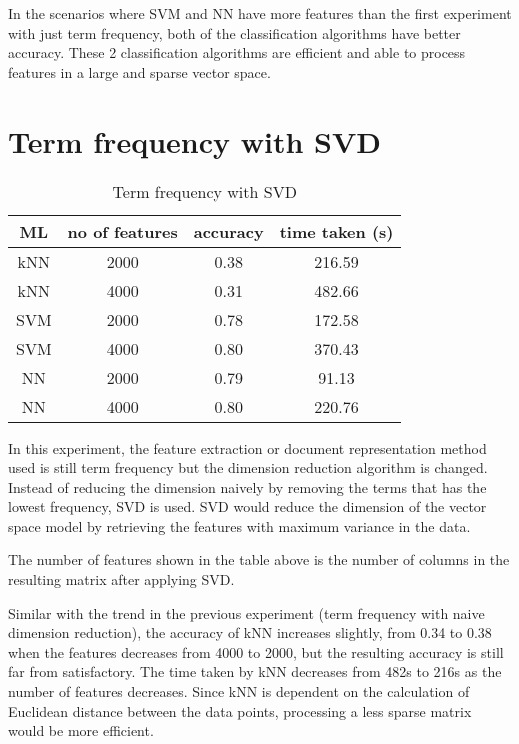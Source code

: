 In the scenarios where SVM and NN have more features than the first experiment with just term frequency, both of the classification algorithms have better accuracy. These 2 classification algorithms are efficient and able to process features in a large and sparse vector space.


\clearpage
\section{Term frequency with SVD}

\begin{table} [ht]
	\centering
	\begin{tabular}{|| c | c | c | c||}
		\hline
		ML & no of features & accuracy & time taken (s) \\ [0.5ex]
		\hline\hline
		kNN & 2000 & 0.38 & 216.59 \\ 
		\hline
		kNN & 4000 & 0.31 & 482.66 \\
		\hline\hline
		SVM & 2000 & 0.78 & 172.58 \\
		\hline
		SVM & 4000 & 0.80 & 370.43 \\
		\hline\hline
		NN & 2000 & 0.79 & 91.13 \\
		\hline
		NN & 4000 & 0.80 & 220.76 \\
		\hline
	\end{tabular}
\caption{Term frequency with SVD}
\label{tbl:termFrequencySvd}
\end{table}

In this experiment, the feature extraction or document representation method used is still term frequency but the dimension reduction algorithm is changed. Instead of reducing the dimension naively by removing the terms that has the lowest frequency, SVD is used. SVD would reduce the dimension of the vector space model by retrieving the features with maximum variance in the data.

The number of features shown in the table above is the number of columns in the resulting matrix after applying SVD.

Similar with the trend in the previous experiment (term frequency with naive dimension reduction), the accuracy of kNN increases slightly, from 0.34 to 0.38 when the features decreases from 4000 to 2000, but the resulting accuracy is still far from satisfactory. The time taken by kNN decreases from 482s to 216s as the number of features decreases. Since kNN is dependent on the calculation of Euclidean distance between the data points, processing a less sparse matrix would be more efficient.

